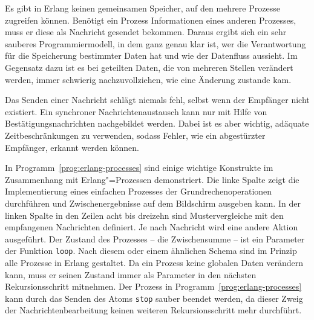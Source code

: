 Es gibt in Erlang keinen gemeinsamen Speicher, auf den mehrere Prozesse zugreifen können. Benötigt ein Prozess Informationen eines anderen Prozesses, muss er diese als Nachricht gesendet bekommen. Daraus ergibt sich ein sehr sauberes Programmiermodell, in dem ganz genau klar ist, wer die Verantwortung für die Speicherung bestimmter Daten hat und wie der Datenfluss aussieht. Im Gegensatz dazu ist es bei geteilten Daten, die von mehreren Stellen verändert werden, immer schwierig nachzuvollziehen, wie eine Änderung zustande kam.

Das Senden einer Nachricht schlägt niemals fehl, selbst wenn der Empfänger nicht existiert. Ein synchroner Nachrichtenaustausch kann nur mit Hilfe von Bestätigungsnachrichten nachgebildet werden. Dabei ist es aber wichtig, adäquate Zeitbeschränkungen zu verwenden, sodass Fehler, wie \zB ein abgestürzter Empfänger, erkannt werden können.

In Programm~\ref{prog:erlang-processes} sind einige wichtige Konstrukte im Zusammenhang mit Erlang"=Prozessen demonstriert. Die linke Spalte zeigt die Implementierung eines einfachen Prozesses der Grundrechenoperationen durchführen und Zwischenergebnisse auf dem Bildschirm ausgeben kann. In der linken Spalte in den Zeilen acht bis dreizehn sind Mustervergleiche mit den empfangenen Nachrichten definiert. Je nach Nachricht wird eine andere Aktion ausgeführt. Der Zustand des Prozesses -- die Zwischensumme -- ist ein Parameter der Funktion \lstinline{loop}. Nach diesem oder einem ähnlichen Schema sind im Prinzip alle Prozesse in Erlang gestaltet. Da ein Prozess keine globalen Daten verändern kann, muss er seinen Zustand immer als Parameter in den nächsten Rekursionsschritt mitnehmen. Der Prozess in Programm~\ref{prog:erlang-processes} kann durch das Senden des Atoms \lstinline{stop} sauber beendet werden, da dieser Zweig der Nachrichtenbearbeitung keinen weiteren Rekursionsschritt mehr durchführt.

